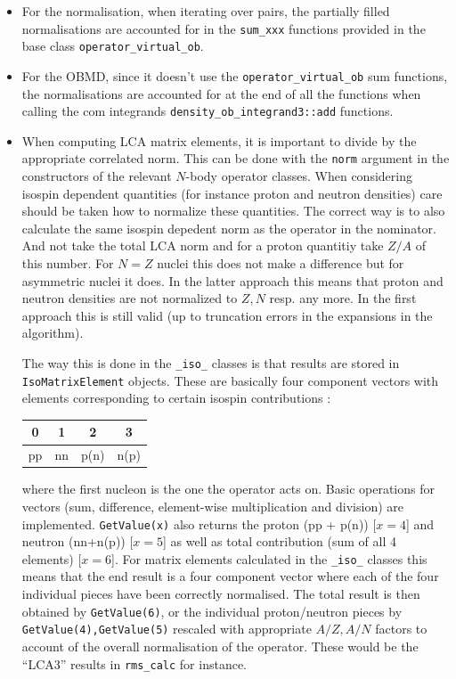\documentclass[10pt]{article}
\begin{document}
\begin{itemize}
\item For the normalisation, when iterating over pairs, the partially filled 
normalisations are accounted for in the \texttt{sum\_xxx} functions provided in 
the base class \texttt{operator\_virtual\_ob}.
\item For the OBMD, since it doesn't use the  \texttt{operator\_virtual\_ob} 
sum functions, the normalisations are accounted for at the end of all the 
 functions when calling the com integrands 
\texttt{density\_ob\_integrand3::add} functions.

\item When computing LCA matrix elements, it is important to divide by the 
appropriate correlated norm.  This can be done with the \texttt{norm} argument 
in the constructors of the relevant $N$-body operator classes.  When 
considering isospin dependent quantities (for instance proton and neutron 
densities) care should be taken how to normalize these quantities.  The correct 
way is to also calculate the same isospin depedent norm as the operator in the 
nominator.  And not take the total LCA norm and for a proton quantitiy take 
$Z/A$ of this number.  For $N=Z$ nuclei this does not make a difference but for 
asymmetric nuclei it does.  In the latter approach this means that proton and 
neutron densities are not normalized to $Z, N$ resp. any more.  In the first 
approach this is still valid (up to truncation errors in the expansions in the 
algorithm).  

The way this is done in the \texttt{\_iso\_} classes is that results are stored in \texttt{IsoMatrixElement} objects.  These are basically four component vectors with elements corresponding to certain isospin contributions :

\begin{tabular}{cccc}
0&1&2&3\\
\hline
pp&nn&p(n)&n(p)
\end{tabular}
\quad where the first nucleon is the one the operator acts on.  Basic operations for vectors (sum, difference, element-wise multiplication and division) are implemented.  \texttt{GetValue(x)} also returns the proton (pp + p(n)) [$x=4$] and neutron (nn+n(p)) [$x=5$] as well as total contribution (sum of all 4 elements) [$x=6$].  For matrix elements calculated in the \texttt{\_iso\_} classes this means that the end result is a four component vector where each of the four individual pieces have been correctly normalised.  The total result is then obtained by \texttt{GetValue(6)}, or the individual proton/neutron pieces by \texttt{GetValue(4),GetValue(5)} rescaled with appropriate $A/Z, A/N$ factors to account of the overall normalisation of the operator.  These would be the ``LCA3'' results in \texttt{rms\_calc} for instance.  


\end{itemize}
\end{document}
